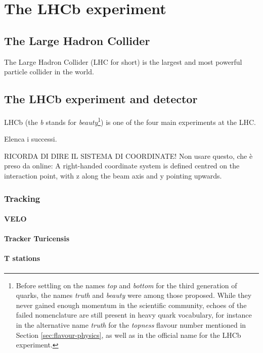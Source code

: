\chapter{The LHCb experiment}
\label{cap:LHCb}

\section{The Large Hadron Collider}
The Large Hadron Collider (LHC for short) is the largest and most powerful particle collider in the world.

\section{The LHCb experiment and detector}
LHCb (the \textit{b} stands for \textit{beauty}\footnote{Before settling on the names \textit{top} and \textit{bottom} for the third generation of quarks, the names \textit{truth} and \textit{beauty} were among those proposed. While they never gained enough momentum in the scientific community, echoes of the failed nomenclature are still present in heavy quark vocabulary, for instance in the alternative name \textit{truth} for the \textit{topness} flavour number mentioned in Section \ref{sec:flavour-physics}, as well as in the official name for the LHCb experiment.}) is one of the four main experiments at the LHC.

Elenca i successi.

\label{info:LHCb_system}
RICORDA DI DIRE IL SISTEMA DI COORDINATE!
Non usare questo, che è preso da online:
A right-handed coordinate system is defined centred on the interaction point, with z along the beam axis and y pointing upwards.

\subsection{Tracking}

\subsubsection{VELO}

\subsubsection{Tracker Turicensis}

\subsubsection{T stations}

